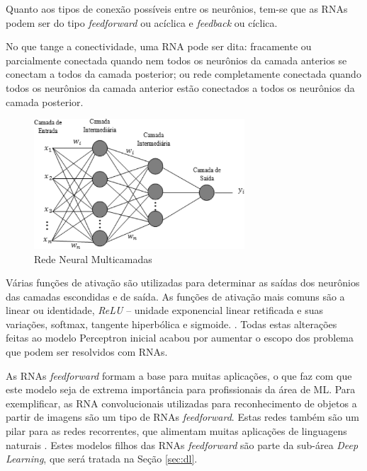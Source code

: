 Quanto aos tipos de conexão possíveis entre os neurônios, tem-se que as RNAs podem ser do tipo \emph{feedforward} ou acíclica  e \emph{feedback} ou cíclica.

No que tange a conectividade, uma RNA pode ser dita: fracamente ou parcialmente conectada quando nem todos os neurônios da camada anterios se conectam a todos da camada posterior; ou rede completamente conectada quando todos os neurônios da camada anterior estão conectados a todos os neurônios da camada posterior.

\begin{figure}[ht]
	\centering
	\includegraphics[width=0.7\textwidth]{img/mlprna.jpg}
	\caption{Rede Neural Multicamadas}
	\label{fig:mlp}
\end{figure}

Várias funções de ativação são utilizadas para determinar as saídas dos neurônios das camadas escondidas e de saída. As funções de ativação mais comuns são a linear ou identidade, \emph{ReLU} -- unidade exponencial linear retificada e suas variações, softmax, tangente hiperbólica e sigmoide.
. Todas estas alterações feitas ao modelo Perceptron inicial acabou por aumentar o escopo dos problema que podem ser resolvidos com RNAs.


As RNAs \emph{feedforward} formam a base para muitas aplicações, o que faz com que este modelo seja de extrema importância para profissionais da área de ML. Para exemplificar, as RNA convolucionais utilizadas para reconhecimento de objetos a partir de imagens são um tipo de RNAs \emph{feedforward}. Estas redes também são um pilar para as redes recorrentes, que alimentam muitas aplicações de linguagens naturais \cite{goodfellow2016deep}. Estes modelos filhos das RNAs \emph{feedforward} são parte da sub-área \emph{Deep Learning}, que será tratada na Seção \ref{sec:dl}.
